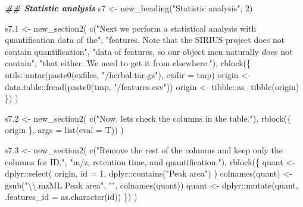 \documentclass[
]{article}
\newenvironment{Shaded}{\begin{snugshade}}{\end{snugshade}}
\newcommand{\AttributeTok}[1]{\textcolor[rgb]{0.77,0.63,0.00}{#1}}
\newcommand{\DecValTok}[1]{\textcolor[rgb]{0.00,0.00,0.81}{#1}}
\newcommand{\DocumentationTok}[1]{\textcolor[rgb]{0.56,0.35,0.01}{\textbf{\textit{#1}}}}
\newcommand{\FloatTok}[1]{\textcolor[rgb]{0.00,0.00,0.81}{#1}}
\newcommand{\FunctionTok}[1]{\textcolor[rgb]{0.00,0.00,0.00}{#1}}
\newcommand{\NormalTok}[1]{#1}
\newcommand{\OtherTok}[1]{\textcolor[rgb]{0.56,0.35,0.01}{#1}}
\newcommand{\SpecialCharTok}[1]{\textcolor[rgb]{0.00,0.00,0.00}{#1}}
\newcommand{\StringTok}[1]{\textcolor[rgb]{0.31,0.60,0.02}{#1}}
\begin{document}
\begin{Shaded}
\begin{Highlighting}[]
\DocumentationTok{\#\# Statistic analysis}
\NormalTok{s7 }\OtherTok{\textless{}{-}} \FunctionTok{new\_heading}\NormalTok{(}\StringTok{"Statistic analysis"}\NormalTok{, }\DecValTok{2}\NormalTok{)}

\NormalTok{s7}\FloatTok{.1} \OtherTok{\textless{}{-}} \FunctionTok{new\_section2}\NormalTok{(}
  \FunctionTok{c}\NormalTok{(}\StringTok{"Next we perform a statistical analysis with quantification data of the"}\NormalTok{,}
    \StringTok{"features. Note that the SIRIUS project does not contain quantification"}\NormalTok{,}
    \StringTok{"data of features, so our object \textasciigrave{}mcn\textasciigrave{} naturally does not contain"}\NormalTok{,}
    \StringTok{"that either. We need to get it from elsewhere."}\NormalTok{),}
  \FunctionTok{rblock}\NormalTok{(\{}
\NormalTok{    utils}\SpecialCharTok{::}\FunctionTok{untar}\NormalTok{(}\FunctionTok{paste0}\NormalTok{(exfiles, }\StringTok{"/herbal.tar.gz"}\NormalTok{), }\AttributeTok{exdir =}\NormalTok{ tmp)}
\NormalTok{    origin }\OtherTok{\textless{}{-}}\NormalTok{ data.table}\SpecialCharTok{::}\FunctionTok{fread}\NormalTok{(}\FunctionTok{paste0}\NormalTok{(tmp, }\StringTok{"/features.csv"}\NormalTok{))}
\NormalTok{    origin }\OtherTok{\textless{}{-}}\NormalTok{ tibble}\SpecialCharTok{::}\FunctionTok{as\_tibble}\NormalTok{(origin)}
\NormalTok{  \})}
\NormalTok{)}

\NormalTok{s7}\FloatTok{.2} \OtherTok{\textless{}{-}} \FunctionTok{new\_section2}\NormalTok{(}
  \FunctionTok{c}\NormalTok{(}\StringTok{"Now, let\textquotesingle{}s check the columns in the table."}\NormalTok{),}
  \FunctionTok{rblock}\NormalTok{(\{}
\NormalTok{    origin}
\NormalTok{  \}, }\AttributeTok{args =} \FunctionTok{list}\NormalTok{(}\AttributeTok{eval =}\NormalTok{ T))}
\NormalTok{)}

\NormalTok{s7}\FloatTok{.3} \OtherTok{\textless{}{-}} \FunctionTok{new\_section2}\NormalTok{(}
  \FunctionTok{c}\NormalTok{(}\StringTok{"Remove the rest of the columns and keep only the columns for ID,"}\NormalTok{,}
    \StringTok{"m/z, retention time, and quantification."}\NormalTok{),}
  \FunctionTok{rblock}\NormalTok{(\{}
\NormalTok{    quant }\OtherTok{\textless{}{-}}\NormalTok{ dplyr}\SpecialCharTok{::}\FunctionTok{select}\NormalTok{(}
\NormalTok{      origin, }\AttributeTok{id =} \DecValTok{1}\NormalTok{, dplyr}\SpecialCharTok{::}\FunctionTok{contains}\NormalTok{(}\StringTok{"Peak area"}\NormalTok{)}
\NormalTok{    )}
    \FunctionTok{colnames}\NormalTok{(quant) }\OtherTok{\textless{}{-}} \FunctionTok{gsub}\NormalTok{(}\StringTok{"}\SpecialCharTok{\textbackslash{}\textbackslash{}}\StringTok{.mzML Peak area"}\NormalTok{, }\StringTok{""}\NormalTok{, }\FunctionTok{colnames}\NormalTok{(quant))}
\NormalTok{    quant }\OtherTok{\textless{}{-}}\NormalTok{ dplyr}\SpecialCharTok{::}\FunctionTok{mutate}\NormalTok{(quant, }\AttributeTok{.features\_id =} \FunctionTok{as.character}\NormalTok{(id))}
\NormalTok{  \})}
\NormalTok{)}


\end{Highlighting}
\end{Shaded}
\end{document}
